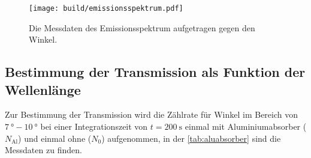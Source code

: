   \begin{figure}[H]
    \centering
    \texttt{[image: build/emissionsspektrum.pdf]}
    \caption{Die Messdaten des Emissionsspektrum aufgetragen gegen den Winkel.}
    \label{fig:emissionsspektrum}
  \end{figure}

\subsection{Bestimmung der Transmission als Funktion der Wellenlänge}
\label{subsec:T(lambda)}

  Zur Bestimmung der Transmission wird die Zählrate für Winkel im Bereich von $\SI{7}{\degree}-\SI{10}{\degree}$ bei einer Integrationszeit von 
  $t = \SI{200}{\second}$ einmal mit Aluminiumabsorber ($N_{\text{Al}}$) und einmal ohne ($N_0$) aufgenommen, in der \autoref{tab:aluabsorber} sind die Messdaten 
  zu finden.

